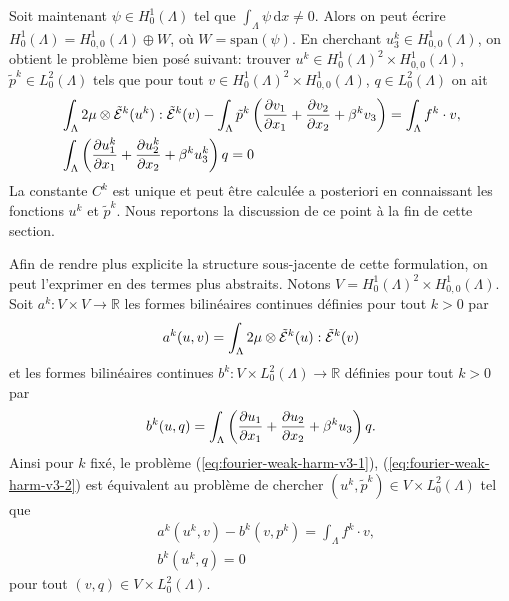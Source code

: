 Soit maintenant $\psi \in H^1_0(\Lambda)$ tel que $\int_\Lambda
\psi\,\mathrm dx \neq 0$. Alors on peut écrire $H^1_0(\Lambda) =
H^1_{0,0}(\Lambda) \oplus W$, où $W =\mathrm{span}(\psi)$. En
cherchant $u_3^k \in H^1_{0,0}(\Lambda)$, on obtient
le problème bien posé suivant: trouver $u^k \in
H_0^1(\Lambda)^2 \times H_{0,0}^1(\Lambda)$, $\tilde p^k \in
L^2_0(\Lambda)$ tels que pour tout $v \in H_0^1(\Lambda)^2 \times
H_{0,0}^1(\Lambda)$, $q \in L^2_0(\Lambda)$ on ait
\begin{align}
  &\int_\Lambda 2\mu\otimes\tilde{\mathcal E}^k(u^k):\tilde{\mathcal E}^k(v)
  - \int_\Lambda \tilde p^k\left( \frac{\partial v_1}{\partial x_1} +
    \frac{\partial v_2}{\partial x_2} + \beta^k v_3 \right)
  = \int_\Lambda f^k\cdot v,\label{eq:fourier-weak-harm-v3-1}\\
  &\int_\Lambda \left( \frac{\partial u_1^k}{\partial x_1} + \frac{\partial u_2^k}{\partial x_2} + \beta^k u_3^k \right)q = 0\label{eq:fourier-weak-harm-v3-2}
\end{align}
La constante $C^k$ est unique et peut être calculée a posteriori en
connaissant les fonctions $u^k$ et $\tilde p^k$. Nous reportons la
discussion de ce point à la fin de cette section.

Afin de rendre plus explicite la structure sous-jacente de cette
formulation, on peut l'exprimer en des termes plus abstraits. Notons
$V = H^1_0(\Lambda)^2\times H^1_{0,0}(\Lambda)$. Soit $a^k:V\times V
\to \mathbb R$ les formes bilinéaires continues définies pour tout $k
> 0$ par
\begin{equation}
  a^k(u,v) = \int_\Lambda
  2\mu\otimes\tilde{\mathcal E}^k(u):\tilde{\mathcal E}^k(v)
\end{equation}
et les formes bilinéaires continues $b^k:V\times L^2_0(\Lambda)\to\mathbb
R$ définies pour tout $k > 0$ par
\begin{equation}
  b^k(u, q) = \int_\Lambda \left( \frac{\partial u_1}{\partial x_1} +
    \frac{\partial u_2}{\partial x_2} + \beta^k u_3 \right)q.
\end{equation}
Ainsi pour $k$ fixé, le problème (\ref{eq:fourier-weak-harm-v3-1}),
(\ref{eq:fourier-weak-harm-v3-2}) est équivalent au problème de
chercher $(u^k,\tilde p^k)\in V \times L^2_0(\Lambda)$ tel que
\begin{align}
  &a^k(u^k,v) - b^k(v,p^k) = \int_\Lambda f^k\cdot v,\label{eq:abstr-weak-harm-1}\\
  & b^k(u^k, q) = 0\label{eq:abstr-weak-harm-2}
\end{align}
pour tout $(v, q)\in V \times L^2_0(\Lambda)$.

